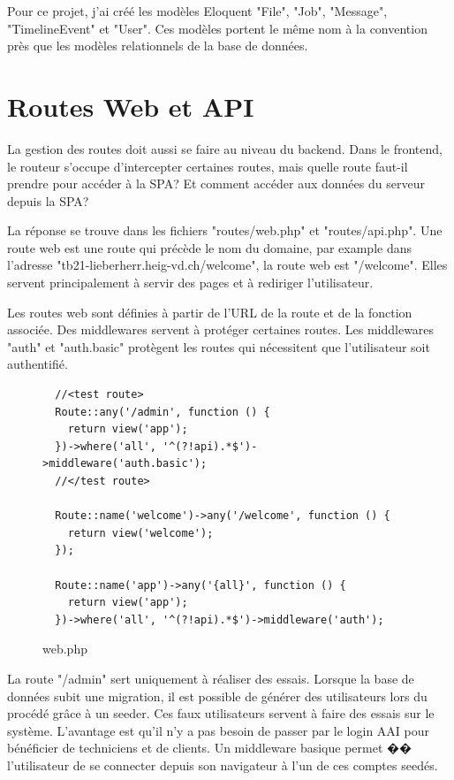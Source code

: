 \documentclass[
    iai, %
    eai, %
]{heig-tb}
\begin{document}
Pour ce projet, j'ai créé les modèles Eloquent "File", "Job", "Message", "TimelineEvent" et "User". Ces modèles portent le même nom à la convention près que les modèles relationnels de la base de données.

\newpage
\section{Routes Web et API}
\label{section:API}
La gestion des routes doit aussi se faire au niveau du backend. Dans le frontend, le routeur s'occupe d'intercepter certaines routes, mais quelle route faut-il prendre pour accéder à la SPA?
Et comment accéder aux données du serveur depuis la SPA?

La réponse se trouve dans les fichiers "routes/web.php" et "routes/api.php". Une route web est une route qui précède le nom du domaine, par example dans l'adresse "tb21-lieberherr.heig-vd.ch/welcome", la route web est "/welcome". Elles servent principalement à servir des pages et à rediriger l'utilisateur.

Les routes web sont définies à partir de l'URL de la route et de la fonction associée. Des middlewares servent à protéger certaines routes. Les middlewares "auth" et "auth.basic" protègent les routes qui nécessitent que l'utilisateur soit authentifié.

\begin{figure}[h]
  \begin{verbatim}
  //<test route>
  Route::any('/admin', function () {
    return view('app');
  })->where('all', '^(?!api).*$')->middleware('auth.basic');
  //</test route>

  Route::name('welcome')->any('/welcome', function () {
    return view('welcome');
  });

  Route::name('app')->any('{all}', function () {
    return view('app');
  })->where('all', '^(?!api).*$')->middleware('auth');
  \end{verbatim}
  \caption{web.php}
\end{figure}

La route "/admin" sert uniquement à réaliser des essais. Lorsque la base de données subit une migration, il est possible de générer des utilisateurs lors du procédé grâce à un seeder. Ces faux utilisateurs servent à faire des essais sur le système. L'avantage est qu'il n'y a pas besoin de passer par le login AAI pour bénéficier de techniciens et de clients. Un middleware basique permet �� l'utilisateur de se connecter depuis son navigateur à l'un de ces comptes seedés.
\end{document}
